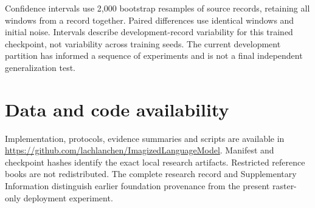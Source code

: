 Confidence intervals use 2,000 bootstrap resamples of source records, retaining
all windows from a record together. Paired differences use identical windows
and initial noise. Intervals describe development-record variability for this
trained checkpoint, not variability across training seeds. The current
development partition has informed a sequence of experiments and is not a
final independent generalization test.

\balance
\section*{Data and code availability}
Implementation, protocols, evidence summaries and scripts are available in
\url{https://github.com/lachlanchen/ImagizedLanguageModel}. Manifest and
checkpoint hashes identify the exact local research artifacts. Restricted
reference books are not redistributed. The complete research record and
Supplementary Information distinguish earlier foundation provenance from the
present raster-only deployment experiment.


